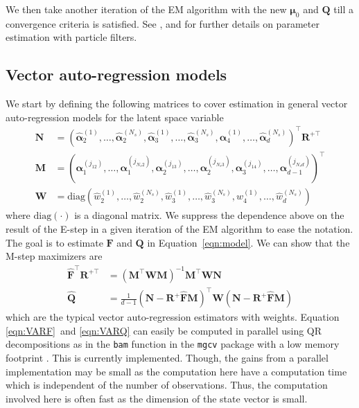 \documentclass[notitlepage]{article}
\renewcommand{\vec}[1]{\bm{#1}}
\newcommand{\mat}[1]{\mathbf{#1}}
\newcommand{\Lparen}[1]{\left( #1\right)}
\newcommand{\optor}[2]{#1\Lparen{#2}}
\newcommand{\diag}[1]{\optor{\text{diag}}{#1}}
\newcommand{\partic}[3]{#1_{#2}^{\Lparen{#3}}}
\newcommand{\particS}[3]{\widehat{#1}_{#2}^{\Lparen{#3}}}
\newcommand{\nPart}{N}
\newcommand{\nPeriods}{d}
\begin{document}
We then take another iteration of the EM algorithm with the new $\vec\mu_0$ and $\mat{Q}$ 
till a convergence criteria is satisfied.  See \cite{kantas15}, \cite{del10} and \cite{schon11} for further details on parameter estimation with particle filters.

\subsection{Vector auto-regression models}\label{subsec:VAR}
We start by defining the following matrices to cover estimation in general vector auto-regression models for the latent space variable %
%
\begin{align*}
\mat{N} &= \Lparen{
    	\particS{\vec{\alpha}}{2}{1},
    	\dots, 
    	\particS{\vec{\alpha}}{2}{\nPart_s}, 
    	\particS{\vec{\alpha}}{3}{1},
    	\dots, 
    	\particS{\vec{\alpha}}{3}{\nPart_s},
    	\particS{\vec{\alpha}}{4}{1},
    	\dots, 
   		\particS{\vec{\alpha}}{\nPeriods}{\nPart_s}
	}^\top\mat{R}^{+\top} \\
%
\mat{M} &= \Lparen{
    	\partic{\vec{\alpha}}{1}{j_{12}},
    	\dots, 
    	\partic{\vec{\alpha}}{1}{j_{\nPart_s2}}, 
    	\partic{\vec{\alpha}}{2}{j_{13}},
    	\dots, 
    	\partic{\vec{\alpha}}{2}{j_{\nPart_s3}},
    	\partic{\vec{\alpha}}{3}{j_{14}},
    	\dots, 
   		\partic{\vec{\alpha}}{\nPeriods - 1}{j_{\nPart_s\nPeriods}}
	}^\top \\
%
\mat{W} &= \diag{
		\particS{w}{2}{1}, \dots, \particS{w}{2}{\nPart_s},
		\particS{w}{3}{1}, \dots, \particS{w}{3}{\nPart_s},
		\particS{w}{4}{1}, \dots,\particS{w}{\nPeriods}{\nPart_s}
	}
\end{align*}%
% 
where $\diag{\cdot}$ is a diagonal matrix. We suppress the dependence above
 on the result of the E-step in 
a given iteration of the EM algorithm to ease the notation. The goal is to estimate $\mat{F}$ and $\mat{Q}$ 
in Equation~\eqref{eqn:model}. We can show that the M-step maximizers are%
% 
\begin{align}
\widehat{\mat{F}}^\top\mat{R}^{+\top} &=
	\Lparen{\mat{M}^\top\mat{W}\mat{M}}^{-1}	
	\mat{M}^\top\mat{W}\mat{N} \label{eqn:VARF} \\
%
\widehat{\mat{Q}} &= 
	\frac{1}{\nPeriods - 1}
	\Lparen{\mat{N} - \mat{R}^+\widehat{\mat{F}}\mat{M}}^\top
	\mat{W}
	\Lparen{\mat{N} - \mat{R}^+\widehat{\mat{F}}\mat{M}} \label{eqn:VARQ}
\end{align}%
%
which are the typical vector auto-regression estimators with weights. Equation \eqref{eqn:VARF}~and \eqref{eqn:VARQ} can easily be computed in parallel using QR decompositions as in the \texttt{bam} function in the \texttt{mgcv} package with a low memory footprint \citep[see][]{wood14}. This is currently implemented. Though, the gains from a parallel implementation may be small as the computation here have a computation time which is independent of the number of observations. Thus, the computation involved here is often fast
as the dimension of the state vector is small.
\end{document}
